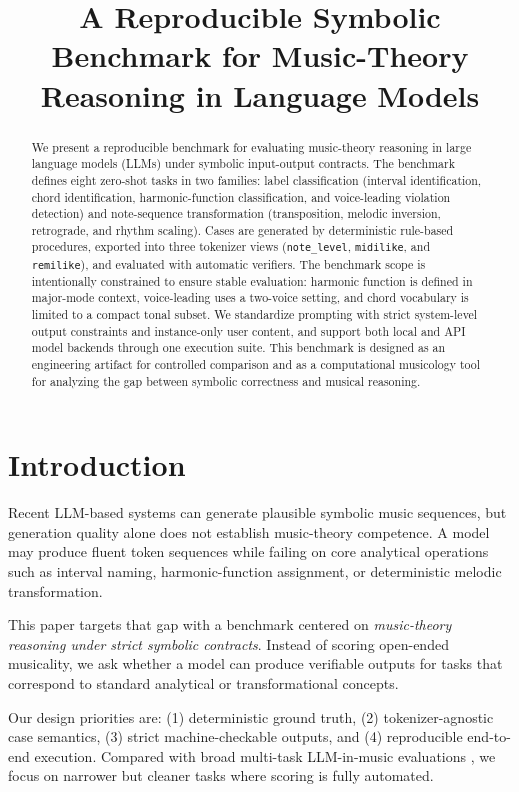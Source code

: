 \documentclass{article}
\title{A Reproducible Symbolic Benchmark for Music-Theory Reasoning in Language Models}
\begin{document}
\maketitle

\begin{abstract}
We present a reproducible benchmark for evaluating music-theory reasoning in large language models (LLMs) under symbolic input-output contracts. The benchmark defines eight zero-shot tasks in two families: label classification (interval identification, chord identification, harmonic-function classification, and voice-leading violation detection) and note-sequence transformation (transposition, melodic inversion, retrograde, and rhythm scaling). Cases are generated by deterministic rule-based procedures, exported into three tokenizer views (\texttt{note\_level}, \texttt{midilike}, and \texttt{remilike}), and evaluated with automatic verifiers. The benchmark scope is intentionally constrained to ensure stable evaluation: harmonic function is defined in major-mode context, voice-leading uses a two-voice setting, and chord vocabulary is limited to a compact tonal subset. We standardize prompting with strict system-level output constraints and instance-only user content, and support both local and API model backends through one execution suite. This benchmark is designed as an engineering artifact for controlled comparison and as a computational musicology tool for analyzing the gap between symbolic correctness and musical reasoning.
\end{abstract}

\section{Introduction}
\label{sec:introduction}

Recent LLM-based systems can generate plausible symbolic music sequences, but generation quality alone does not establish music-theory competence. A model may produce fluent token sequences while failing on core analytical operations such as interval naming, harmonic-function assignment, or deterministic melodic transformation.

This paper targets that gap with a benchmark centered on \emph{music-theory reasoning under strict symbolic contracts}. Instead of scoring open-ended musicality, we ask whether a model can produce verifiable outputs for tasks that correspond to standard analytical or transformational concepts.

Our design priorities are: (1) deterministic ground truth, (2) tokenizer-agnostic case semantics, (3) strict machine-checkable outputs, and (4) reproducible end-to-end execution. Compared with broad multi-task LLM-in-music evaluations \cite{zhou2024llmsmusicreason}, we focus on narrower but cleaner tasks where scoring is fully automated.
\end{document}
